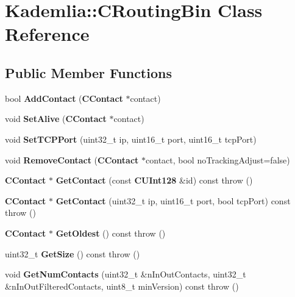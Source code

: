 \section{Kademlia::CRoutingBin Class Reference}
\label{classKademlia_1_1CRoutingBin}
\subsection*{Public Member Functions}
\begin{DoxyCompactItemize}
\item 
bool {\bfseries AddContact} ({\bf CContact} $\ast$contact)\label{classKademlia_1_1CRoutingBin_a6d0f02a90cf0e2b0f227d552cc3c5ae2}

\item 
void {\bfseries SetAlive} ({\bf CContact} $\ast$contact)\label{classKademlia_1_1CRoutingBin_a4df7da5bcd65683f7f4c38ac4dee9ecd}

\item 
void {\bfseries SetTCPPort} (uint32\_\-t ip, uint16\_\-t port, uint16\_\-t tcpPort)\label{classKademlia_1_1CRoutingBin_a331431560843937eb7f36f42f410ab34}

\item 
void {\bfseries RemoveContact} ({\bf CContact} $\ast$contact, bool noTrackingAdjust=false)\label{classKademlia_1_1CRoutingBin_a82613eaf4dcc441b934e689a952daf33}

\item 
{\bf CContact} $\ast$ {\bfseries GetContact} (const {\bf CUInt128} \&id) const   throw ()\label{classKademlia_1_1CRoutingBin_adc6e370c528edc3372e71c1e85a36e53}

\item 
{\bf CContact} $\ast$ {\bfseries GetContact} (uint32\_\-t ip, uint16\_\-t port, bool tcpPort) const   throw ()\label{classKademlia_1_1CRoutingBin_a92325ccde89320b3f3018cb6dc34e8c7}

\item 
{\bf CContact} $\ast$ {\bfseries GetOldest} () const   throw ()\label{classKademlia_1_1CRoutingBin_a0a809a7805012e42412c3d449b85fd90}

\item 
uint32\_\-t {\bfseries GetSize} () const   throw ()\label{classKademlia_1_1CRoutingBin_a21bafef44c41879b0523a0094ff243ad}

\item 
void {\bfseries GetNumContacts} (uint32\_\-t \&nInOutContacts, uint32\_\-t \&nInOutFilteredContacts, uint8\_\-t minVersion) const   throw ()\label{classKademlia_1_1CRoutingBin_a7824efb559893f87e48e839a25c00a3d}


\end{DoxyCompactItemize}
